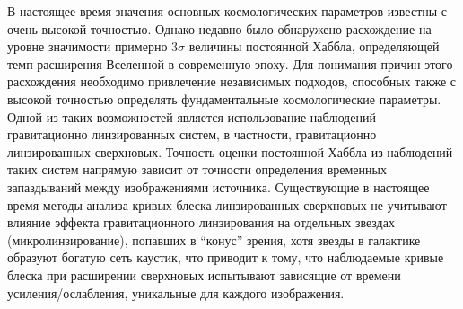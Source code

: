 В настоящее время значения основных космологических параметров известны с очень высокой точностью. Однако недавно было обнаружено расхождение на уровне значимости примерно 3$\sigma$ величины постоянной Хаббла, определяющей темп расширения Вселенной в современную эпоху. Для понимания причин этого расхождения необходимо привлечение независимых подходов, способных также с высокой точностью определять фундаментальные космологические параметры. Одной из таких возможностей является использование наблюдений гравитационно линзированных систем, в частности, гравитационно линзированных сверхновых. Точность оценки постоянной Хаббла из наблюдений таких систем напрямую зависит от точности определения временных запаздываний между изображениями источника. Существующие в настоящее время методы анализа кривых блеска линзированных сверхновых не учитывают влияние эффекта гравитационного линзирования на отдельных звездах (микролинзирование), попавших в “конус” зрения, хотя звезды в галактике образуют богатую сеть каустик, что приводит к тому, что наблюдаемые кривые блеска при расширении сверхновых испытывают зависящие от времени усиления/ослабления, уникальные для каждого изображения.
